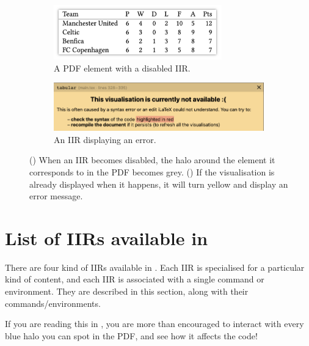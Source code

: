 \documentclass[11pt, a4paper]{article}
\begin{document}
\begin{figure}[h]
    \centering
    \begin{subfigure}[b]{0.5\textwidth}
        \centering
        \includegraphics[width=0.8\textwidth]{img/disabled-table.png}
        \caption{A PDF element with a disabled IIR.}
        \label{subfig:grey-halo}
    \end{subfigure}%
    \begin{subfigure}[b]{0.5\textwidth}
        \centering
        \includegraphics[width=\textwidth]{img/syntax-error-in-visualisation.png}
        \caption{An IIR displaying an error.}
        \label{subfig:syntax-error-in-iir}
    \end{subfigure}%
    \caption{() When an IIR becomes disabled, the halo around the element it corresponds to in the PDF becomes grey. () If the visualisation is already displayed when it happens, it will turn yellow and display an error message.}
    \label{fig:disabled-visualisations}
\end{figure}




\section{List of IIRs available in \iLaTeX{}}
\label{sec:list-of-irrs}

There are four kind of IIRs available in \iLaTeX{}.
Each IIR is specialised for a particular kind of content, and each IIR is associated with a single command or environment.
They are described in this section, along with their commands/environments.

If you are reading this in \iLaTeX{}, you are more than encouraged to interact with every blue halo you can spot in the PDF, and see how it affects the code!
\end{document}
